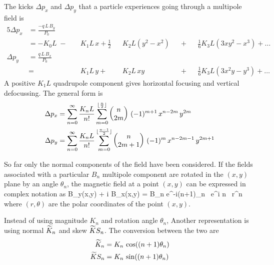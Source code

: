 The kicks $\Delta p_x$ and $\Delta p_y$ that a
particle experiences going through a multipole field is
\begin{alignat}{5}
  \Delta p_x & = \frac{-q \, L \, B_y}{P_0} \label{pqlbp1} \\
             & = -K_0 L \;-\; 
             && K_1 L \, x \plus 
             \frac{1}{2} && K_2 L (y^2 - x^2) && \plus 
             && \frac{1}{6} K_3 L (3x y^2 - x^3) \plus \ldots 
             \nonumber \\
  \Delta p_y & = \frac{q \, L \, B_x}{P_0} \label{pqlbp2} \\
             & =     
             && K_1 L \, y \plus 
             && K_2 L \, xy && \plus 
             && \frac{1}{6} K_3L (3x^2 y - y^3) \plus \ldots \nonumber 
\end{alignat}
A positive $K_1L$ quadrupole component gives
horizontal focusing and vertical defocussing. The general form is
\begin{align}
  \Delta p_x &= \sum_{n = 0}^{\infty} \frac{K_n L}{n!} 
             \sum_{m = 0}^{\lfloor \frac{n}{2} \rfloor}
             \begin{pmatrix} n \cr 2m \end{pmatrix} \,
             (-1)^{m+1} \, x^{n-2m} \, y^{2m} \\
  \Delta p_y &= \sum_{n = 0}^{\infty} \frac{K_n L}{n!} 
             \sum_{m = 0}^{\lfloor \frac{n-1}{2} \rfloor}
             \begin{pmatrix} n \cr 2m+1 \end{pmatrix} \,
             (-1)^{m} \, x^{n-2m-1} \, y^{2m+1}
\end{align}

So far only the normal components of the field have been
considered. If the fields associated with a particular $B_n$ multipole
component are rotated in the $(x, y)$ plane by an angle $\theta_n$, the
magnetic field at a point $(x,y)$ can be expressed in complex notation
as
\Begineq
  B_y(x,y) + i B_x(x,y) = 
     B_n e^{-i(n+1)\theta_n} \, e^{i n \theta} \, r^n 
  \label{bib1nb}
\Endeq
where $(r, \theta)$ are the polar coordinates of the point $(x, y)$.

Instead of using magnitude $K_n$ and rotation angle $\theta_n$,
Another representation is using normal $\widetilde K_n$ and skew $\widetilde
KS_n$. The conversion between the two are
\begin{align}
  \widetilde K_n  &= K_n \, \cos((n + 1) \theta_n) \nonumber \\
  \widetilde KS_n &= K_n \, \sin((n + 1) \theta_n) 
\end{align}

